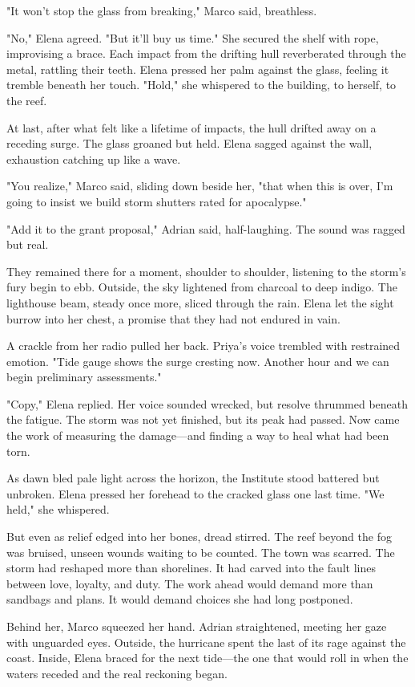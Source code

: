 "It won't stop the glass from breaking," Marco said, breathless.

"No," Elena agreed. "But it'll buy us time." She secured the shelf with rope, improvising a brace. Each impact from the drifting hull reverberated through the metal, rattling their teeth. Elena pressed her palm against the glass, feeling it tremble beneath her touch. "Hold," she whispered to the building, to herself, to the reef.

At last, after what felt like a lifetime of impacts, the hull drifted away on a receding surge. The glass groaned but held. Elena sagged against the wall, exhaustion catching up like a wave.

"You realize," Marco said, sliding down beside her, "that when this is over, I'm going to insist we build storm shutters rated for apocalypse."

"Add it to the grant proposal," Adrian said, half-laughing. The sound was ragged but real.

They remained there for a moment, shoulder to shoulder, listening to the storm's fury begin to ebb. Outside, the sky lightened from charcoal to deep indigo. The lighthouse beam, steady once more, sliced through the rain. Elena let the sight burrow into her chest, a promise that they had not endured in vain.

A crackle from her radio pulled her back. Priya's voice trembled with restrained emotion. "Tide gauge shows the surge cresting now. Another hour and we can begin preliminary assessments."

"Copy," Elena replied. Her voice sounded wrecked, but resolve thrummed beneath the fatigue. The storm was not yet finished, but its peak had passed. Now came the work of measuring the damage—and finding a way to heal what had been torn.

As dawn bled pale light across the horizon, the Institute stood battered but unbroken. Elena pressed her forehead to the cracked glass one last time. "We held," she whispered.

But even as relief edged into her bones, dread stirred. The reef beyond the fog was bruised, unseen wounds waiting to be counted. The town was scarred. The storm had reshaped more than shorelines. It had carved into the fault lines between love, loyalty, and duty. The work ahead would demand more than sandbags and plans. It would demand choices she had long postponed.

Behind her, Marco squeezed her hand. Adrian straightened, meeting her gaze with unguarded eyes. Outside, the hurricane spent the last of its rage against the coast. Inside, Elena braced for the next tide—the one that would roll in when the waters receded and the real reckoning began.
